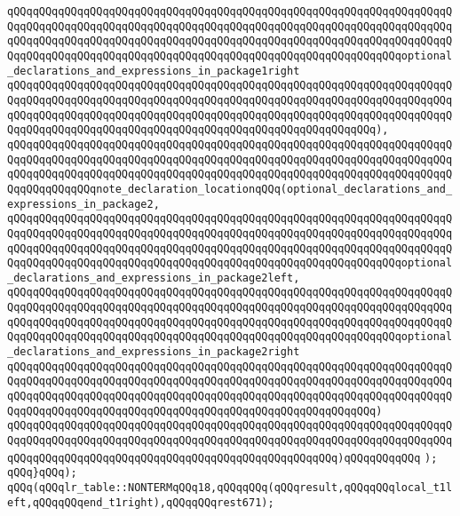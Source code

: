 \verb|qQQqqQQqqQQqqQQqqQQqqQQqqQQqqQQqqQQqqQQqqQQqqQQqqQQqqQQqqQQqqQQqqQQqqQQqqQQqqQQqqQQqqQQqqQQqqQQqqQQqqQQqqQQqqQQqqQQqqQQqqQQqqQQqqQQqqQQqqQQqqQQqqQQqqQQqqQQqqQQqqQQqqQQqqQQqqQQqqQQqqQQqqQQqqQQqqQQqqQQqqQQqqQQqqQQqqQQqqQQqqQQqqQQqqQQqqQQqqQQqqQQqqQQqqQQqqQQqqQQqqQQqqQQqqQQqoptional_declarations_and_expressions_in_package1right|\newline
\verb|qQQqqQQqqQQqqQQqqQQqqQQqqQQqqQQqqQQqqQQqqQQqqQQqqQQqqQQqqQQqqQQqqQQqqQQqqQQqqQQqqQQqqQQqqQQqqQQqqQQqqQQqqQQqqQQqqQQqqQQqqQQqqQQqqQQqqQQqqQQqqQQqqQQqqQQqqQQqqQQqqQQqqQQqqQQqqQQqqQQqqQQqqQQqqQQqqQQqqQQqqQQqqQQqqQQqqQQqqQQqqQQqqQQqqQQqqQQqqQQqqQQqqQQqqQQqqQQqqQQqqQQqqQQq),|\newline
\verb|qQQqqQQqqQQqqQQqqQQqqQQqqQQqqQQqqQQqqQQqqQQqqQQqqQQqqQQqqQQqqQQqqQQqqQQqqQQqqQQqqQQqqQQqqQQqqQQqqQQqqQQqqQQqqQQqqQQqqQQqqQQqqQQqqQQqqQQqqQQqqQQqqQQqqQQqqQQqqQQqqQQqqQQqqQQqqQQqqQQqqQQqqQQqqQQqqQQqqQQqqQQqqQQqqQQqqQQqqQQqqQQqnote_declaration_locationqQQq(optional_declarations_and_expressions_in_package2,|\newline
\verb|qQQqqQQqqQQqqQQqqQQqqQQqqQQqqQQqqQQqqQQqqQQqqQQqqQQqqQQqqQQqqQQqqQQqqQQqqQQqqQQqqQQqqQQqqQQqqQQqqQQqqQQqqQQqqQQqqQQqqQQqqQQqqQQqqQQqqQQqqQQqqQQqqQQqqQQqqQQqqQQqqQQqqQQqqQQqqQQqqQQqqQQqqQQqqQQqqQQqqQQqqQQqqQQqqQQqqQQqqQQqqQQqqQQqqQQqqQQqqQQqqQQqqQQqqQQqqQQqqQQqqQQqqQQqqQQqoptional_declarations_and_expressions_in_package2left,|\newline
\verb|qQQqqQQqqQQqqQQqqQQqqQQqqQQqqQQqqQQqqQQqqQQqqQQqqQQqqQQqqQQqqQQqqQQqqQQqqQQqqQQqqQQqqQQqqQQqqQQqqQQqqQQqqQQqqQQqqQQqqQQqqQQqqQQqqQQqqQQqqQQqqQQqqQQqqQQqqQQqqQQqqQQqqQQqqQQqqQQqqQQqqQQqqQQqqQQqqQQqqQQqqQQqqQQqqQQqqQQqqQQqqQQqqQQqqQQqqQQqqQQqqQQqqQQqqQQqqQQqqQQqqQQqqQQqqQQqoptional_declarations_and_expressions_in_package2right|\newline
\verb|qQQqqQQqqQQqqQQqqQQqqQQqqQQqqQQqqQQqqQQqqQQqqQQqqQQqqQQqqQQqqQQqqQQqqQQqqQQqqQQqqQQqqQQqqQQqqQQqqQQqqQQqqQQqqQQqqQQqqQQqqQQqqQQqqQQqqQQqqQQqqQQqqQQqqQQqqQQqqQQqqQQqqQQqqQQqqQQqqQQqqQQqqQQqqQQqqQQqqQQqqQQqqQQqqQQqqQQqqQQqqQQqqQQqqQQqqQQqqQQqqQQqqQQqqQQqqQQqqQQqqQQqqQQq)|\newline
\verb|qQQqqQQqqQQqqQQqqQQqqQQqqQQqqQQqqQQqqQQqqQQqqQQqqQQqqQQqqQQqqQQqqQQqqQQqqQQqqQQqqQQqqQQqqQQqqQQqqQQqqQQqqQQqqQQqqQQqqQQqqQQqqQQqqQQqqQQqqQQqqQQqqQQqqQQqqQQqqQQqqQQqqQQqqQQqqQQqqQQqqQQqqQQqqQQq)qQQqqQQqqQQq|\newline
\verb|);|\newline
\verb|qQQq}qQQq);|\newline
\verb|qQQq(qQQqlr_table::NONTERMqQQq18,qQQqqQQq(qQQqresult,qQQqqQQqlocal_t1left,qQQqqQQqend_t1right),qQQqqQQqrest671);|\newline
